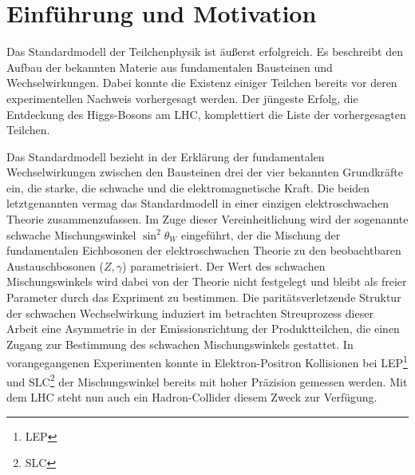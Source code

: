 


\chapter{Einführung und Motivation}


Das Standardmodell der Teilchenphysik ist äußerst erfolgreich. Es beschreibt
den Aufbau der bekannten Materie aus fundamentalen Bausteinen und
Wechselwirkungen. Dabei konnte die Existenz einiger Teilchen bereits vor deren
experimentellen Nachweis vorhergesagt werden. Der jüngeste Erfolg, die
Entdeckung des Higgs-Bosons am \ac{LHC}, komplettiert die Liste der
vorhergesagten Teilchen.

Das Standardmodell bezieht in der Erklärung der fundamentalen Wechselwirkungen
zwischen den Bausteinen drei der vier bekannten Grundkräfte ein, die starke,
die schwache und die elektromagnetische Kraft. Die beiden letztgenannten vermag
das Standardmodell in einer einzigen elektroschwachen Theorie zusammenzufassen.
Im Zuge dieser Vereinheitlichung wird der sogenannte schwache Mischungswinkel
$\sin^2\theta_W$ eingeführt, der die Mischung der fundamentalen Eichbosonen der
elektroschwachen Theorie zu den beobachtbaren Austauschbosonen ($Z,\gamma$)
parametrisiert. Der Wert des schwachen Mischungswinkels wird dabei von der
Theorie nicht festgelegt und bleibt als freier Parameter durch das Expriment zu
bestimmen. Die paritätsverletzende Struktur der schwachen Wechselwirkung
induziert im betrachten Streuprozess dieser Arbeit eine Asymmetrie in der
Emissionsrichtung der Produktteilchen, die einen Zugang zur Bestimmung des
schwachen Mischungswinkels gestattet. In vorangegangenen Experimenten konnte in
Elektron-Positron Kollisionen bei \acs{LEP}\footnote{\acf{LEP}} und
\acs{SLC}\footnote{\acf{SLC}} der Mischungswinkel bereits mit hoher Präzision
gemessen werden. Mit dem \ac{LHC} steht nun auch ein Hadron-Collider diesem
Zweck zur Verfügung.

